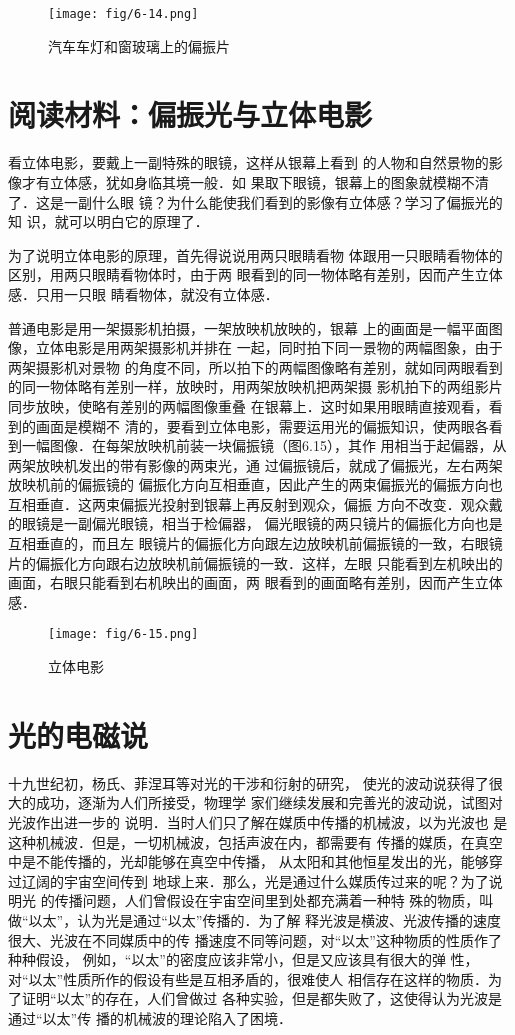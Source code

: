 \begin{figure}[htp]\centering
    \texttt{[image: fig/6-14.png]}
    \caption{汽车车灯和窗玻璃上的偏振片}
    \end{figure}

\section*{阅读材料：偏振光与立体电影}
看立体电影，要戴上一副特殊的眼镜，这样从银幕上看到
的人物和自然景物的影像才有立体感，犹如身临其境一般．如
果取下眼镜，银幕上的图象就模糊不清了．这是一副什么眼
镜？为什么能使我们看到的影像有立体感？学习了偏振光的知
识，就可以明白它的原理了．

为了说明立体电影的原理，首先得说说用两只眼睛看物
体跟用一只眼睛看物体的区别，用两只眼睛看物体时，由于两
眼看到的同一物体略有差别，因而产生立体感．只用一只眼
睛看物体，就没有立体感．

普通电影是用一架摄影机拍摄，一架放映机放映的，银幕
上的画面是一幅平面图像，立体电影是用两架摄影机并排在
一起，同时拍下同一景物的两幅图象，由于两架摄影机对景物
的角度不同，所以拍下的两幅图像略有差别，就如同两眼看到
的同一物体略有差别一样，放映时，用两架放映机把两架摄
影机拍下的两组影片同步放映，使略有差别的两幅图像重叠
在银幕上．这时如果用眼睛直接观看，看到的画面是模糊不
清的，要看到立体电影，需要运用光的偏振知识，使两眼各看
到一幅图像．在每架放映机前装一块偏振镜（图6.15），其作
用相当于起偏器，从两架放映机发出的带有影像的两束光，通
过偏振镜后，就成了偏振光，左右两架放映机前的偏振镜的
偏振化方向互相垂直，因此产生的两束偏振光的偏振方向也
互相垂直．这两束偏振光投射到银幕上再反射到观众，偏振
方向不改变．观众戴的眼镜是一副偏光眼镜，相当于检偏器，
偏光眼镜的两只镜片的偏振化方向也是互相垂直的，而且左
眼镜片的偏振化方向跟左边放映机前偏振镜的一致，右眼镜
片的偏振化方向跟右边放映机前偏振镜的一致．这样，左眼
只能看到左机映出的画面，右眼只能看到右机映出的画面，两
眼看到的画面略有差别，因而产生立体感．
\begin{figure}[htp]\centering
    \texttt{[image: fig/6-15.png]}
    \caption{立体电影}
    \end{figure}

\section{光的电磁说}
十九世纪初，杨氏、菲涅耳等对光的干涉和衍射的研究，
使光的波动说获得了很大的成功，逐渐为人们所接受，物理学
家们继续发展和完善光的波动说，试图对光波作出进一步的
说明．当时人们只了解在媒质中传播的机械波，以为光波也
是这种机械波．但是，一切机械波，包括声波在内，都需要有
传播的媒质，在真空中是不能传播的，光却能够在真空中传播，
从太阳和其他恒星发出的光，能够穿过辽阔的宇宙空间传到
地球上来．那么，光是通过什么媒质传过来的呢？为了说明光
的传播问题，人们曾假设在宇宙空间里到处都充满着一种特
殊的物质，叫做“以太”，认为光是通过“以太”传播的．为了解
释光波是横波、光波传播的速度很大、光波在不同媒质中的传
播速度不同等问题，对“以太”这种物质的性质作了种种假设，
例如，“以太”的密度应该非常小，但是又应该具有很大的弹
性，对“以太”性质所作的假设有些是互相矛盾的，很难使人
相信存在这样的物质．为了证明“以太”的存在，人们曾做过
各种实验，但是都失败了，这使得认为光波是通过“以太”传
播的机械波的理论陷入了困境．

